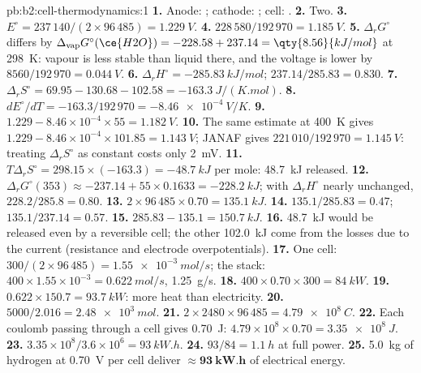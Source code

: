 \begin{solution}{pb:b2:cell-thermodynamics:1}
\textbf{1.} Anode: ; cathode: ;
cell: .
\textbf{2.} Two.
\textbf{3.} $E^\circ = 237\,140/(2 \times 96\,485) = \qty{1.229}{V}$.
\textbf{4.} $228\,580/192\,970 = \qty{1.185}{V}$.
\textbf{5.} $\Delta_r G^\circ$ differs by $\Delta_{\text{vap}}G^\circ(\ce{H2O}) = -228.58 + 237.14 =
\qty{8.56}{kJ/mol}$ at \qty{298}{K}: vapour is less stable than liquid there, and the
voltage is lower by $8560/192\,970 = \qty{0.044}{V}$.
\textbf{6.} $\Delta_r H^\circ = \qty{-285.83}{kJ/mol}$; $237.14/285.83 = 0.830$.
\textbf{7.} $\Delta_r S^\circ = 69.95 - 130.68 - 102.58 = \qty{-163.3}{J/(K.mol)}$.
\textbf{8.} $dE^\circ/dT = -163.3/192\,970 = \qty{-8.46e-4}{V/K}$.
\textbf{9.} $1.229 - 8.46 \times 10^{-4} \times 55 = \qty{1.182}{V}$.
\textbf{10.} The same estimate at \qty{400}{K} gives $1.229 - 8.46 \times 10^{-4}
\times 101.85 = \qty{1.143}{V}$; JANAF gives $221\,010/192\,970 = \qty{1.145}{V}$:
treating $\Delta_r S^\circ$ as constant costs only \qty{2}{mV}.
\textbf{11.} $T\Delta_r S^\circ = 298.15 \times (-163.3) = \qty{-48.7}{kJ}$ per mole:
\qty{48.7}{kJ} released.
\textbf{12.} $\Delta_r G^\circ(353) \approx -237.14 + 55 \times 0.1633 =
\qty{-228.2}{kJ}$; with $\Delta_r H^\circ$ nearly unchanged, $228.2/285.8 = 0.80$.
\textbf{13.} $2 \times 96\,485 \times 0.70 = \qty{135.1}{kJ}$.
\textbf{14.} $135.1/285.83 = 0.47$; $135.1/237.14 = 0.57$.
\textbf{15.} $285.83 - 135.1 = \qty{150.7}{kJ}$.
\textbf{16.} \qty{48.7}{kJ} would be released even by a reversible cell; the other
\qty{102.0}{kJ} come from the losses due to the current (resistance and electrode
overpotentials).
\textbf{17.} One cell: $300/(2 \times 96\,485) = \qty{1.55e-3}{mol/s}$; the stack:
$400 \times 1.55 \times 10^{-3} = \qty{0.622}{mol/s}$, \qty{1.25}{g/s}.
\textbf{18.} $400 \times 0.70 \times 300 = \qty{84}{kW}$.
\textbf{19.} $0.622 \times 150.7 = \qty{93.7}{kW}$: more heat than electricity.
\textbf{20.} $5000/2.016 = \qty{2.48e3}{mol}$.
\textbf{21.} $2 \times 2480 \times 96\,485 = \qty{4.79e8}{C}$.
\textbf{22.} Each coulomb passing through a cell gives \qty{0.70}{J}: $4.79 \times
10^8 \times 0.70 = \qty{3.35e8}{J}$.
\textbf{23.} $3.35 \times 10^8/3.6 \times 10^6 = \qty{93}{kW.h}$.
\textbf{24.} $93/84 = \qty{1.1}{h}$ at full power.
\textbf{25.} \qty{5.0}{kg} of hydrogen at \qty{0.70}{V} per cell deliver
$\boldsymbol{\approx \qty{93}{kW.h}}$ of electrical energy.
\end{solution}
